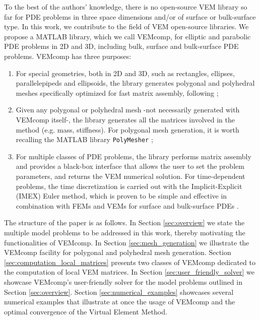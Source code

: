 \documentclass[a4paper]{article}
\begin{document}
{To the best of the authors' knowledge, there is no open-source VEM library so far for PDE problems in three space dimensions and/or of surface or bulk-surface type. In this work,  we contribute to the field of VEM open-source libraries. We propose a MATLAB library,  which we call VEMcomp, for elliptic and parabolic PDE problems in 2D and 3D, including bulk, surface and bulk-surface PDE problems.  VEMcomp has three purposes:
\begin{enumerate}
\item For special geometries, both in 2D and 3D, such as rectangles, ellipses, parallelepipeds and ellipsoids, the library generates polygonal and polyhedral meshes specifically optimized for fast matrix assembly, following \cite{frittelli2021bulk, frittelli2023bsrds};
\item Given any polygonal or polyhedral mesh -not necessarily generated with VEMcomp itself-, the library generates all the matrices involved in the method (e.g. mass, stiffness).  For polygonal mesh generation, it is worth recalling the MATLAB library \texttt{PolyMesher} \cite{Talischi_2012};
\item For multiple classes of PDE problems,  the library performs matrix assembly and provides a black-box interface that allows the user to set the problem parameters, and returns the VEM numerical solution. For time-dependent problems, the time discretization is carried out with the Implicit-Explicit (IMEX) Euler method,  which is proven to be simple and effective in combination with FEMs and VEMs for surface \cite{Frittelli2017preserving, Frittelli2017cross} and bulk-surface PDEs \cite{frittelli2021bulk, frittelli2023bsrds}.
\end{enumerate}
%
The structure of the paper is as follows. In Section \ref{sec:overview} we state the multiple model problems to be addressed in this work, thereby motivating the functionalities of VEMcomp.  In Section \ref{sec:mesh_generation} we illustrate the VEMcomp facility for polygonal and polyhedral mesh generation. Section \ref{sec:computation_local_matrices} presents two classes of VEMcomp dedicated to the computation of local VEM matrices. In Section \ref{sec:user_friendly_solver} we showcase VEMcomp's user-friendly solver for the model problems outlined in Section \ref{sec:overview}. Section \ref{sec:numerical_examples} showcases several numerical examples that illustrate at once the usage of VEMcomp and the optimal convergence of the Virtual Element Method.}
\end{document}
